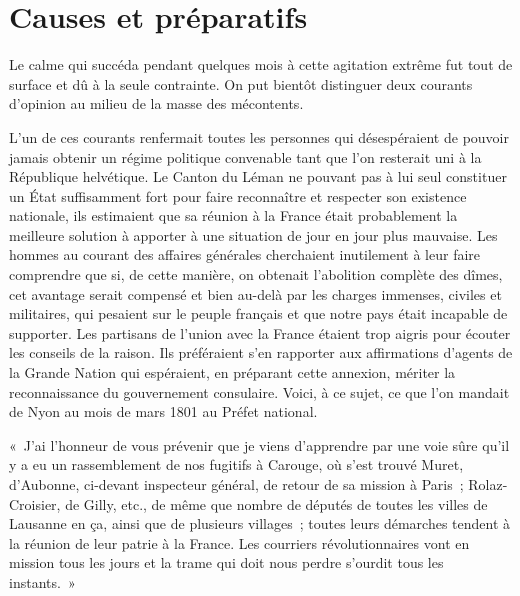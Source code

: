 \documentclass[french,twoside]{book} %
\newenvironment{quoteblock}%
  {\begin{quoting}}
  {\end{quoting}}
\newenvironment{quotebar}{%
    \def\FrameCommand{{\color{rubric!10!}\vrule width 0.5em} \hspace{0.9em}}%
    \def\OuterFrameSep{\itemsep} %
    \MakeFramed {\advance\hsize-\width \FrameRestore}
  }%
  {%
    \endMakeFramed
  }
\renewenvironment{quoteblock}%
  {%
    \savenotes
    \setstretch{0.9}
    \normalfont
    \begin{quotebar}
  }
  {%
    \end{quotebar}
    \spewnotes
  }
\begin{document}
\section[Causes et préparatifs]{Causes et préparatifs}
\noindent Le calme qui succéda pendant quelques mois à cette agitation extrême fut tout de surface et dû à la seule contrainte. On put bientôt distinguer deux courants d’opinion au milieu de la masse des mécontents.\par
L’un de ces courants renfermait toutes les personnes qui désespéraient de pouvoir jamais obtenir un régime politique convenable tant que l’on resterait uni à la République helvétique. Le Canton du Léman ne pouvant pas à lui seul constituer un État suffisamment fort pour faire reconnaître et respecter son existence nationale, ils estimaient que sa réunion à la France était probablement la meilleure solution à apporter à une situation de jour en jour plus mauvaise. Les hommes au courant des affaires générales cherchaient inutilement à leur faire comprendre que si, de cette manière, on obtenait l’abolition complète des dîmes, cet avantage serait compensé et bien au-delà par les charges immenses, civiles et militaires, qui pesaient sur le peuple français et que notre pays était incapable de supporter. Les partisans de l’union avec la France étaient trop aigris pour écouter les conseils de la raison. Ils préféraient s’en rapporter aux affirmations d’agents de la Grande Nation qui espéraient, en préparant cette annexion, mériter la reconnaissance du gouvernement consulaire. Voici, à ce sujet, ce que l’on mandait de Nyon au mois de mars 1801 au Préfet national.\par

\begin{quoteblock}
\noindent « J’ai l’honneur de vous prévenir que je viens d’apprendre par une voie sûre qu’il y a eu un rassemblement de nos fugitifs à Carouge, où s’est trouvé Muret, d’Aubonne, ci-devant inspecteur général, de retour de sa mission à Paris ; Rolaz-Croisier, de Gilly, etc., de même que nombre de députés de toutes les villes de Lausanne en ça, ainsi que de plusieurs villages ; toutes leurs démarches tendent à la réunion de leur patrie à la France. Les courriers révolutionnaires vont en mission tous les jours et la trame qui doit nous perdre s’ourdit tous les instants. »\end{quoteblock}
\end{document}
